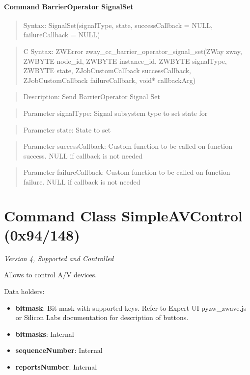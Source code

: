 \paragraph{Command BarrierOperator SignalSet}
\begin{quote}Syntax: SignalSet(signalType, state, successCallback = NULL, failureCallback = NULL)\end{quote}
\begin{quote}C Syntax: ZWError zway\_cc\_barrier\_operator\_signal\_set(ZWay zway, ZWBYTE node\_id, ZWBYTE instance\_id, ZWBYTE signalType, ZWBYTE state, ZJobCustomCallback successCallback, ZJobCustomCallback failureCallback, void* callbackArg)\end{quote}
\begin{quote}Description: Send BarrierOperator Signal Set\end{quote}
\begin{quote}Parameter signalType: Signal subsystem type to set state for\end{quote}
\begin{quote}Parameter state: State to set\end{quote}
\begin{quote}Parameter successCallback: Custom function to be called on function success. NULL if callback is not needed\end{quote}
\begin{quote}Parameter failureCallback: Custom function to be called on function failure. NULL if callback is not needed\end{quote}



\section{Command Class SimpleAVControl (0x94/148)}

\textit{Version 4, Supported and Controlled}
\newline

Allows to control A/V devices.
\newline

\noindent
Data holders:

\begin{itemize}
\item \textbf{bitmask}: Bit mask with supported keys. Refer to Expert UI pyzw\_zwave.js or Silicon Labs documentation for description of buttons.
\item \textbf{bitmasks}: Internal
\item \textbf{sequenceNumber}: Internal
\item \textbf{reportsNumber}: Internal
\end{itemize}

